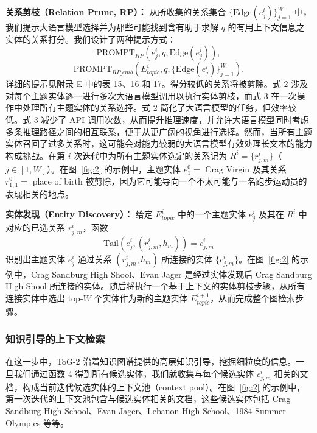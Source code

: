 \documentclass[11pt,UTF8,fontset=fandol]{ctexart}
\newcommand{\toctwo}{ToG-2}
\begin{document}
\noindent\textbf{关系剪枝（Relation Prune, RP）：} 从所收集的关系集合 $\{\mathrm{Edge}(e^{i}_{j})\}^{W}_{j=1}$ 中，我们提示大语言模型选择并为那些可能找到含有助于求解 $q$ 的有用上下文信息之实体的关系打分。我们设计了两种提示方式：
\begin{equation}
\mathrm{PROMPT}_{RP}(e^{i}_{j},q,\mathrm{Edge}(e^{i}_{j})),
\end{equation}
\begin{equation}
\mathrm{PROMPT}_{RP\_cmb}(E^{i}_{topic},q,\{\mathrm{Edge}(e^{i}_{j})\}^{W}_{j=1}).
\end{equation}
详细的提示见附录 E 中的表 15、16 和 17。得分较低的关系将被剪除。式 2 涉及对每个主题实体逐一进行多次大语言模型调用以执行实体剪枝，而式 3 在一次操作中处理所有主题实体的关系选择。式 2 简化了大语言模型的任务，但效率较低。式 3 减少了 API 调用次数，从而提升推理速度，并允许大语言模型同时考虑多条推理路径之间的相互联系，便于从更广阔的视角进行选择。然而，当所有主题实体召回了过多关系时，这可能会对能力较弱的大语言模型有效处理长文本的能力构成挑战。在第 $i$ 次迭代中为所有主题实体选定的关系记为 $R^{i}=\{r^{i}_{j,m}\}$（$j\in[1,W]$）。在图~\ref{fig:2} 的示例中，主题实体 $e^{0}_{1}=$ Crag Virgin 及其关系 $r^{0}_{1,1}=$ place of birth 被剪除，因为它可能导向一个不太可能与一名跑步运动员的表现相关的地点。

\noindent\textbf{实体发现（Entity Discovery）：} 给定 $E^{i}_{topic}$ 中的一个主题实体 $e^{i}_{j}$ 及其在 $R^{i}$ 中对应的已选关系 $r^{i}_{j,m}$，函数
\begin{equation}
\mathrm{Tail}(e^{i}_{j},(r^{i}_{j,m},h_m))=c^{i}_{j,m}
\end{equation}
识别出主题实体 $e^{i}_{j}$ 通过关系 $(r^{i}_{j,m},h_m)$ 所连接的实体 $\{c^{i}_{j,m}\}$。在图~\ref{fig:2} 的示例中，Crag Sandburg High Shool、Evan Jager 是经过实体发现后 Crag Sandburg High Shool 所连接的实体。随后将执行一个基于上下文的实体剪枝步骤，从所有连接实体中选出 top-$W$ 个实体作为新的主题实体 $E^{i+1}_{topic}$，从而完成整个图检索步骤。

\subsubsection{知识引导的上下文检索}

在这一步中，\toctwo{} 沿着知识图谱提供的高层知识引导，挖掘细粒度的信息。一旦我们通过函数 4 得到所有候选实体，我们就收集与每个候选实体 $c^{i}_{j,m}$ 相关的文档，构成当前迭代候选实体的上下文池（context pool）。在图~\ref{fig:2} 的示例中，第一次迭代的上下文池包含与候选实体相关的文档，这些候选实体包括 Crag Sandburg High School、Evan Jager、Lebanon High School、1984 Summer Olympics 等等。
\end{document}
